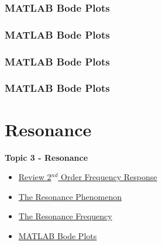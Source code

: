 \documentclass[fleqn]{beamer} %
\newcommand{\sectionIVtitle}{Resonance}
\newcommand{\sectionIIIsubsectionIVtitle}{MATLAB Bode Plots}
\newcommand{\sectionIVsubsectionItitle}{Review 2$^{nd}$ Order Frequency Response}
\newcommand{\sectionIVsubsectionIItitle}{The Resonance Phenomenon}
\newcommand{\sectionIVsubsectionIIItitle}{The Resonance Frequency}
\newcommand{\sectionIVsubsectionIVtitle}{MATLAB Bode Plots}
\begin{document}
			\begin{frame}
				\frametitle{\sectionIIIsubsectionIVtitle}
				\bigskip

				

				\btVFill 
			\end{frame}

			\begin{frame}
				\frametitle{\sectionIIIsubsectionIVtitle}
				\bigskip

			

		 		\btVFill 
			\end{frame}
			
			\begin{frame}
				\frametitle{\sectionIIIsubsectionIVtitle}
				\bigskip
				
				
					
				\btVFill 
			\end{frame}

			\begin{frame}
				\frametitle{\sectionIIIsubsectionIVtitle}
				\bigskip
			
				
				\btVFill 
			\end{frame}
    

	\section{\sectionIVtitle}\label{sectionIV}

		\begin{frame}
			\large \textbf{Topic 3 - \sectionIVtitle} \vspace{3mm}\\

			\begin{itemize}
				\item \hyperlink{sectionIVsubsectionI}{\sectionIVsubsectionItitle} \vspc %
				\item \hyperlink{sectionIVsubsectionII}{\sectionIVsubsectionIItitle} \vspc %
				\item \hyperlink{sectionIVsubsectionIII}{\sectionIVsubsectionIIItitle} \vspc %
				\item \hyperlink{sectionIVsubsectionIV}{\sectionIVsubsectionIVtitle} \vspc %

			\end{itemize}

		\end{frame}
\end{document}
